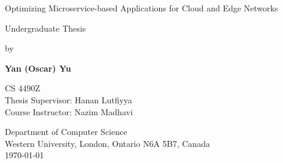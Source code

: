 \begin{titlepage}
    \begin{center}
        \vspace*{1cm}

        \Huge{Optimizing Microservice-based Applications for Cloud and Edge Networks}
        \vspace{0.5cm}

        \Large
        Undergraduate Thesis
        \vspace{0.5cm}

        by
        \vspace{0.5cm}

        \textbf{Yan (Oscar) Yu}

        \vfill

        \large
        CS 4490Z\\
        Thesis Supervisor: Hanan Lutfiyya\\
        Course Instructor: Nazim Madhavi

        \vspace{0.5cm}
        Department of Computer Science\\
        Western University, London, Ontario N6A 5B7, Canada\\
        \today

    \end{center}
\end{titlepage}